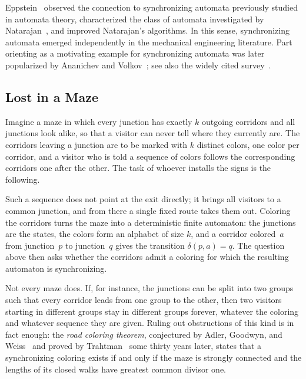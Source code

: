 Eppstein~\cite{Eppstein90} observed the connection to synchronizing automata previously studied in automata theory, characterized the class of automata investigated by Natarajan~\cite{DBLP:conf/focs/Natarajan86}, and improved Natarajan's algorithms. In this sense, 
synchronizing automata emerged independently in the mechanical engineering literature.
Part orienting as a motivating example for synchronizing automata was later popularized by Ananichev and Volkov~\cite{AnanichevVolkov04,DBLP:journals/tcs/AnanichevV04}; see also the widely cited survey~\cite{DBLP:conf/lata/Volkov08}.

\subsection{Lost in a Maze} 
\label{intro:sec:examples:maze}

Imagine a maze in which every junction has exactly $k$ outgoing corridors
and all junctions look alike, so that a visitor can never tell where they
currently are. The corridors leaving a junction are to be marked with $k$
distinct colors, one color per corridor, and a visitor who is told a
sequence of colors follows the corresponding corridors one after the other.
The task of whoever installs the signs is the following.

\smallskip
\begin{center}
\end{center}
\smallskip

Such a sequence does not point at the exit directly; it brings all visitors
to a common junction, and from there a single fixed route takes them out.
Coloring the corridors turns the maze into a deterministic finite automaton:
the junctions are the states, the colors form an alphabet of size $k$, and
a corridor colored~$a$ from junction~$p$ to junction~$q$ gives the
transition $\delta(p,a) = q$. The question above then asks whether the
corridors admit a coloring for which the resulting automaton is
synchronizing.

Not every maze does. If, for instance, the junctions can be split into two
groups such that every corridor leads from one group to the other, then two
visitors starting in different groups stay in different groups forever,
whatever the coloring and whatever sequence they are given. Ruling out
obstructions of this kind is in fact enough: the \emph{road coloring
	theorem}, conjectured by Adler, Goodwyn, and Weiss~\cite{adler77} and proved
by Trahtman~\cite{trahtman09} some thirty years later, states that a
synchronizing coloring exists if and only if the maze is strongly connected
and the lengths of its closed walks have greatest common divisor one.
